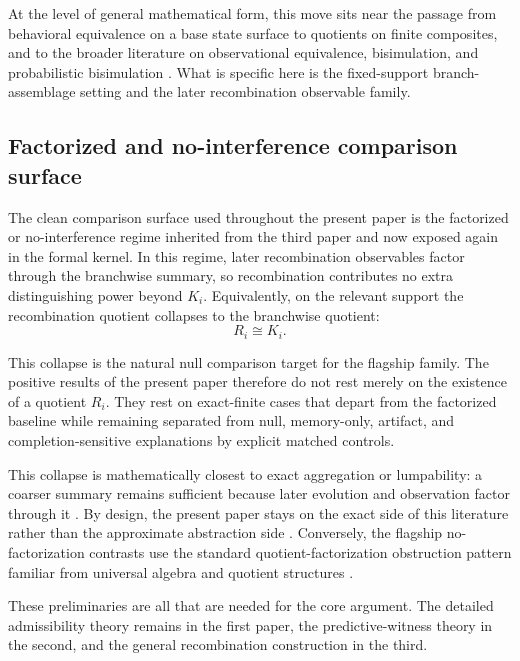 \documentclass[11pt]{article}
\theoremstyle{definition}
\begin{document}
At the level of general mathematical form, this move sits near the passage from behavioral equivalence on a base state surface to quotients on finite composites, and to the broader literature on observational equivalence, bisimulation, and probabilistic bisimulation \cite{Nerode1958,Park1981,Milner1980,LarsenSkou1991,Sangiorgi2011,vanGlabbeek2001}. What is specific here is the fixed-support branch-assemblage setting and the later recombination observable family.

\subsection{Factorized and no-interference comparison surface}

The clean comparison surface used throughout the present paper is the factorized or no-interference regime inherited from the third paper and now exposed again in the formal kernel. In this regime, later recombination observables factor through the branchwise summary, so recombination contributes no extra distinguishing power beyond \(K_i\). Equivalently, on the relevant support the recombination quotient collapses to the branchwise quotient: \cite{Tsiokos2026MarkingErasureRecombination}
\[
R_i \cong K_i.
\]

This collapse is the natural null comparison target for the flagship family. The positive results of the present paper therefore do not rest merely on the existence of a quotient \(R_i\). They rest on exact-finite cases that depart from the factorized baseline while remaining separated from null, memory-only, artifact, and completion-sensitive explanations by explicit matched controls.

This collapse is mathematically closest to exact aggregation or lumpability: a coarser summary remains sufficient because later evolution and observation factor through it \cite{KemenySnell1976,Buchholz1994,GivanDeanGreig2003}. By design, the present paper stays on the exact side of this literature rather than the approximate abstraction side \cite{LiWalshLittman2006}. Conversely, the flagship no-factorization contrasts use the standard quotient-factorization obstruction pattern familiar from universal algebra and quotient structures \cite{BurrisSankappanavar1981}.

These preliminaries are all that are needed for the core argument. The detailed admissibility theory remains in the first paper, the predictive-witness theory in the second, and the general recombination construction in the third.
\end{document}
